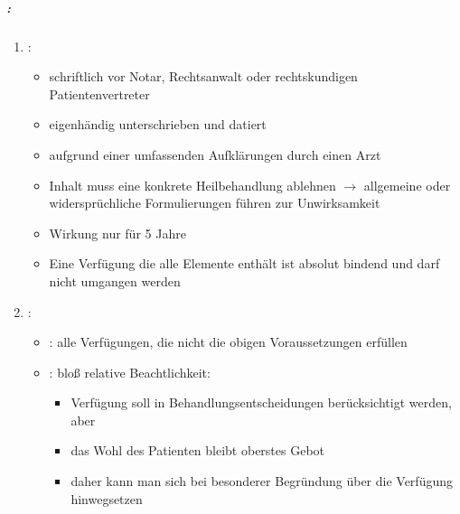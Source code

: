 \subparagraph{:}

\begin{enumerate}
    \item {}:
    
    
    \begin{itemize}
        \item schriftlich vor Notar, Rechtsanwalt oder rechtskundigen
        Patientenvertreter
        
        \item eigenhändig unterschrieben und datiert
        
        \item aufgrund einer umfassenden Aufklärungen durch einen Arzt
        
        \item Inhalt muss eine konkrete Heilbehandlung ablehnen ${\rightarrow}$ allgemeine oder
        widerspr\"uchliche Formulierungen f\"uhren zur Unwirksamkeit
        
        \item Wirkung nur f\"ur 5 Jahre
        
        \item Eine Verf\"ugung die alle Elemente enthält ist absolut bindend und
        darf nicht umgangen werden
    \end{itemize}
    
    \item {}:
    
    \begin{itemize}
        \item {\mdseries
        : alle Verf\"ugungen, die nicht
        die obigen Voraussetzungen erf\"ullen}
        
        \item {\mdseries
        : blo{\ss} relative
        Beachtlichkeit:}
        
        \begin{itemize}
            \item {\mdseries
            Verf\"ugung soll in Behandlungsentscheidungen ber\"ucksichtigt werden,
            aber}
            
            \item {\mdseries
            das Wohl des Patienten bleibt oberstes Gebot }
            
            \item {\mdseries
            daher kann man sich bei besonderer Begr\"undung \"uber die Verf\"ugung
            hinwegsetzen}
            
        \end{itemize}
    \end{itemize}
\end{enumerate}

